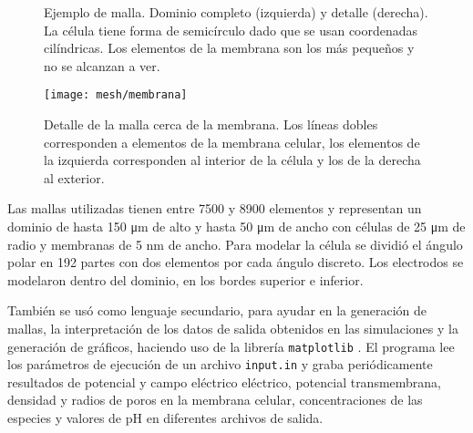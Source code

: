 \begin{figure} 
\caption{Ejemplo de malla. Dominio completo (izquierda) y detalle (derecha). La célula tiene forma de semicírculo dado que se usan coordenadas cilíndricas. Los elementos de la membrana son los más pequeños y no se alcanzan a ver.}
\end{figure}


\begin{figure}
	\texttt{[image: mesh/membrana]}
	\caption{Detalle de la malla cerca de la membrana. Los líneas dobles corresponden a elementos de la membrana celular, los elementos de la izquierda corresponden al interior de la célula y los de la derecha al exterior.}
	\label{fig:mesh-membrana}
\end{figure}


Las mallas utilizadas tienen entre 7500 y 8900 elementos y representan un dominio de hasta 150 \si{\micro\metre} de alto y hasta 50 \si{\micro\metre} de ancho con células de 25 \si{\micro\metre} de radio y membranas de 5 \si{\nano\metre} de ancho. Para modelar la célula se dividió el ángulo polar en 192 partes con dos elementos por cada ángulo discreto. Los electrodos se modelaron dentro del dominio, en los bordes superior e inferior.

También se usó  como lenguaje secundario, para ayudar en la generación de mallas, la interpretación de los datos de salida obtenidos en las simulaciones y la generación de gráficos, haciendo uso de la librería \texttt{matplotlib} \cite{matplotlib}. El programa lee los parámetros de ejecución de un archivo \texttt{input.in} y graba periódicamente resultados de potencial y campo eléctrico eléctrico, potencial transmembrana, densidad y radios de poros en la membrana celular, concentraciones de las especies y valores de pH en diferentes archivos de salida.
